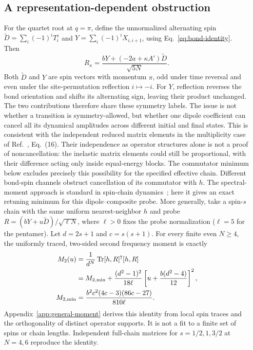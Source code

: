 \subsection{A representation-dependent obstruction}

For the quartet root at $q=\pi$, define the unnormalized alternating spin
$\widetilde D=\sum_i(-1)^iT_i^z$ and
$Y=\sum_i(-1)^iX_{i,i+1}$, using Eq.~\eqref{eq:bond-identity}. Then
\begin{equation}
 R_\kappa=\frac{bY+(-2a+\kappa A')\widetilde D}{\sqrt{5N}}.
 \label{eq:thermal-source}
\end{equation}
Both $\widetilde D$ and $Y$ are spin vectors with momentum $\pi$,
odd under time reversal and even under the site-permutation reflection
$i\mapsto-i$. For $Y$, reflection reverses the bond orientation and
shifts its alternating sign, leaving their product unchanged.
The two contributions therefore share these symmetry labels. The issue is
not whether a transition is symmetry-allowed, but whether one dipole
coefficient can cancel all its dynamical amplitudes across different
initial and final states.
This is consistent with the independent reduced matrix elements in the
multiplicity case of Ref.~, Eq.~(16).
Their independence as operator structures alone is not a proof of
noncancellation: the inelastic matrix elements could still be
proportional, with their difference acting only inside equal-energy
blocks. The commutator minimum below excludes precisely this possibility
for the specified effective chain.
Different bond-spin channels obstruct cancellation of its commutator with
$h$. The spectral-moment approach is standard in spin-chain
dynamics~\cite{mueller1982sumrules}; here it gives an exact retuning
minimum for this dipole--composite probe. More generally, take a spin-$s$
chain with the same uniform nearest-neighbor
$h$ and probe $R=(bY+u\widetilde D)/\sqrt{\ell N}$, where
$\ell>0$ fixes the probe normalization ($\ell=5$ for the pentamer).
Let $d=2s+1$ and $c=s(s+1)$. For every finite even $N\ge4$, the
uniformly traced, two-sided second frequency moment is exactly
\begin{align}
 M_2(u)&=\frac{1}{d^N}\operatorname{Tr}[h,R]^\dagger[h,R]\notag\\
 &=M_{2,\min}+\frac{(d^2-1)^2}{18\ell}
       \left[u+\frac{b(d^2-4)}{12}\right]^2,\\
 M_{2,\min}&=\frac{b^2c^2(4c-3)(86c-27)}{810\ell}.
 \label{eq:general-moment}
\end{align}
Appendix~\ref{app:general-moment} derives this identity from local spin
traces and the orthogonality of distinct operator supports. It is not a
fit to a finite set of spins or chain lengths. Independent full-chain
matrices for $s=1/2,1,3/2$ at $N=4,6$ reproduce the identity.

